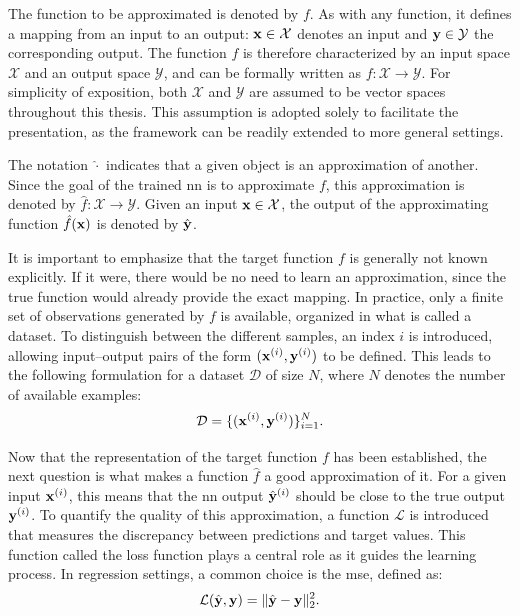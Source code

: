 The function to be approximated is denoted by $f$.
As with any function, it defines a mapping from an input to an output: $\mathbf{x} \in \mathcal{X}$ denotes an input and $\mathbf{y} \in \mathcal{Y}$ the corresponding output.
The function $f$ is therefore characterized by an input space $\mathcal{X}$ and an output space $\mathcal{Y}$, and can be formally written as $f : \mathcal{X} \to \mathcal{Y}$.
For simplicity of exposition, both $\mathcal{X}$ and $\mathcal{Y}$ are assumed to be vector spaces throughout this thesis.
This assumption is adopted solely to facilitate the presentation, as the framework can be readily extended to more general settings.

The notation $\hat{\cdot}$ indicates that a given object is an approximation of another.
Since the goal of the trained \gls{nn} is to approximate $f$, this approximation is denoted by $\hat{f} : \mathcal{X} \to \mathcal{Y}$.
Given an input $\mathbf{x} \in \mathcal{X}$, the output of the approximating function $\hat{f}(\mathbf{x})$ is denoted by $\hat{\mathbf{y}}$.

It is important to emphasize that the target function $f$ is generally not known explicitly.
If it were, there would be no need to learn an approximation, since the true function would already provide the exact mapping.
In practice, only a finite set of observations generated by $f$ is available, organized in what is called a dataset.
To distinguish between the different samples, an index $i$ is introduced, allowing input--output pairs of the form $(\mathbf{x}^{(i)}, \mathbf{y}^{(i)})$ to be defined.
This leads to the following formulation for a dataset $\mathcal{D}$ of size $N$, where $N$ denotes the number of available examples:
\begin{equation}
    \mathcal{D} = \{(\mathbf{x}^{(i)}, \mathbf{y}^{(i)})\}_{i=1}^{N}.
    \label{eq:dataset}
\end{equation}

Now that the representation of the target function $f$ has been established, the next question is what makes a function $\hat{f}$ a good approximation of it.
For a given input $\mathbf{x}^{(i)}$, this means that the \gls{nn} output $\hat{\mathbf{y}}^{(i)}$ should be close to the true output $\mathbf{y}^{(i)}$.
To quantify the quality of this approximation, a function $\mathcal{L}$ is introduced that measures the discrepancy between predictions and target values.
This function called the loss function plays a central role as it guides the learning process.
In regression settings, a common choice is the \gls{mse}, defined as:
\begin{equation}
    \mathcal{L}(\hat{\mathbf{y}}, \mathbf{y}) = \|\hat{\mathbf{y}} - \mathbf{y}\|_2^2.
    \label{eq:mse}
\end{equation}

